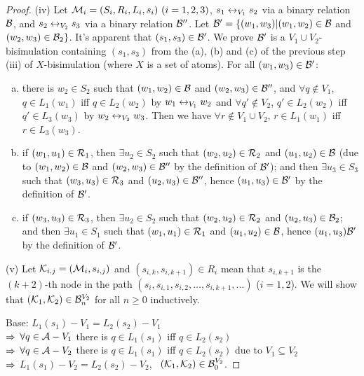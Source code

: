 \documentclass{article}
\begin{document}
\begin{proof}
(iv) Let ${\cal M}_i=(S_i,R_i,L_i,s_i)~(i=1,2,3)$, $s_1 \leftrightarrow_{V_1} s_2$ via a binary relation ${\cal B}$, and $s_2 \leftrightarrow_{V_2} s_3$ via a binary relation ${\cal B}''$. Let ${\cal B}' = \{(w_1, w_3)| (w_1, w_2)\in {\cal B}$ and $(w_2, w_3)\in {\cal B}_2\}$. It's apparent that $(s_1, s_3) \in {\cal B}'$. We prove ${\cal B}'$ is a $V_1 \cup V_2$-bisimulation containing $(s_1, s_3)$ from the (a), (b) and (c) of the previous step (iii) of $X$-bisimulation (where $X$ is a set of atoms). For all $(w_1, w_3) \in {\cal B}'$:
\begin{enumerate}[(a)]
  \item there is $w_2 \in S_2$ such that $(w_1,w_2)\in {\cal B}$ and $(w_2, w_3)\in {\cal B}''$, and $\forall q \notin V_1$, $q \in L_1(w_1)$ iff $q \in L_2(w_2)$ by $w_1 \leftrightarrow_{V_1} w_2$ and $\forall q' \notin V_2$, $q'\in L_2(w_2)$ iff $q'\in L_3(w_3)$ by $w_2 \leftrightarrow_{V_2} w_3$. Then we have $\forall r\notin V_1 \cup V_2$, $r \in L_1(w_1)$ iff $r \in L_3(w_3)$.
  \item if $(w_1, u_1) \in {\cal R}_1$, then $\exists u_2\in S_2$ such that $(w_2, u_2) \in {\cal R}_2$ and $(u_1,u_2)\in {\cal B}$ (due to $(w_1,w_2)\in {\cal B}$ and $(w_2, w_3) \in {\cal B}''$ by the definition of ${\cal B}'$); and then $\exists u_3 \in S_3$ such that $(w_3, u_3) \in {\cal R}_3$ and $(u_2, u_3) \in {\cal B}''$, hence $(u_1, u_3) \in {\cal B}'$ by the definition of ${\cal B}'$.
  \item if $(w_3, u_3) \in {\cal R}_3$, then $\exists u_2\in S_2$ such that $(w_2, u_2) \in {\cal R}_2$ and $(u_2, u_3) \in {\cal B}_2$; and then $\exists u_1 \in S_1$ such that $(w_1, u_1) \in {\cal R}_1$ and $(u_1, u_2) \in {\cal B}$, hence $(u_1, u_3) {\cal B}'$ by the definition of ${\cal B}'$.
\end{enumerate}

(v) Let ${\cal K}_{i, j}=({\cal M}_i, s_{i,j})$ and $(s_{i, k}, s_{i, k+1}) \in R_i$ mean that $s_{i, k+1}$ is the $(k+2)$-th node in the path
 $(s_i, s_{i, 1}, s_{i,2}, \dots , s_{i, k+1}, \dots)$ ($i=1,2$).
We will show that $({\cal K}_1, {\cal K}_2) \in {\cal B}_n^{V_2}$ for all $n \ge 0$ inductively.

Base: $L_1(s_1) - V_1 = L_2(s_2) - V_1$\\
$\Rightarrow$ $\forall q \in {\cal A} - V_1$ there is $q \in L_1(s_1)$ iff $q \in L_2(s_2)$\\
$\Rightarrow$ $\forall q \in {\cal A} - V_2$ there is $q \in L_1(s_1)$ iff $q \in L_2(s_2)$ due to $V_1 \subseteq V_2$\\
$\Rightarrow$ $L_1(s_1) - V_2 = L_2(s_2) - V_2$, \ie\ $({\cal K}_1, {\cal K}_2) \in {\cal B}_0^{V_2}$.


\end{proof}
\end{document}

